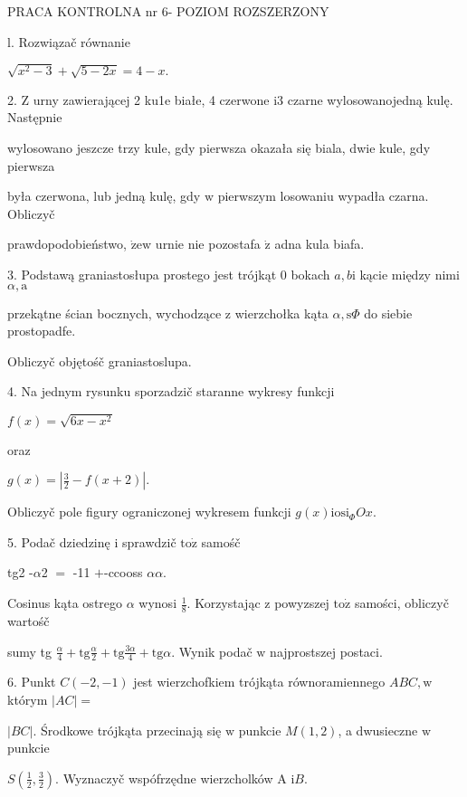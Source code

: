 \documentclass[a4paper,12pt]{article}
\begin{document}
PRACA KONTROLNA nr 6- POZIOM ROZSZERZONY

l. Rozwiązač równanie

$\sqrt{x^{2}-3}+\sqrt{5-2x}=4-x.$

2. $\mathrm{Z}$ urny zawierającej 2 ku1e białe, 4 czerwone $\mathrm{i}3$ czarne wylosowanojedną kulę. Następnie

wylosowano jeszcze trzy kule, gdy pierwsza okazała się biala, dwie kule, gdy pierwsza

była czerwona, lub jedną kulę, gdy $\mathrm{w}$ pierwszym losowaniu wypadła czarna. Obliczyč

prawdopodobieństwo, $\dot{\mathrm{z}}\mathrm{e}\mathrm{w}$ urnie nie pozostafa $\dot{\mathrm{z}}$ adna kula biafa.

3. Podstawą graniastosłupa prostego jest trójkąt $0$ bokach $a, b\mathrm{i}$ kącie między nimi $\alpha, \mathrm{a}$

przekątne ścian bocznych, wychodzące $\mathrm{z}$ wierzchołka kąta $\alpha, \mathrm{s}\Phi$ do siebie prostopadfe.

Obliczyč objętośč graniastoslupa.

4. Na jednym rysunku sporzadzič staranne wykresy funkcji

$f(x)=\sqrt{6x-x^{2}}$

oraz

$g(x)=|\displaystyle \frac{3}{2}-f(x+2)|.$

Obliczyč pole figury ograniczonej wykresem funkcji $g(x)\mathrm{i}\mathrm{o}\mathrm{s}\mathrm{i}_{\Phi}Ox.$

5. Podač dziedzinę $\mathrm{i}$ sprawdzič $\mathrm{t}\mathrm{o}\dot{\mathrm{z}}$ samośč

tg2 -$\alpha$2 $=$ -11 $+$-ccooss $\alpha\alpha$.

Cosinus kąta ostrego $\alpha$ wynosi $\displaystyle \frac{1}{8}$. Korzystając $\mathrm{z}$ powyzszej $\mathrm{t}\mathrm{o}\dot{\mathrm{z}}$ samości, obliczyč wartośč

sumy tg $\displaystyle \frac{\alpha}{4}+\mathrm{t}\mathrm{g}\frac{\alpha}{2}+\mathrm{t}\mathrm{g}\frac{3\alpha}{4}+\mathrm{t}\mathrm{g}\alpha$. Wynik podač $\mathrm{w}$ najprostszej postaci.

6. Punkt $C(-2,-1)$ jest wierzchofkiem trójkąta równoramiennego $ABC, \mathrm{w}$ którym $|AC|=$

$|BC|$. Środkowe trójkąta przecinają się $\mathrm{w}$ punkcie $M(1,2)$, a dwusieczne $\mathrm{w}$ punkcie

$S(\displaystyle \frac{1}{2},\frac{3}{2})$. Wyznaczyč wspófrzędne wierzcholków A $\mathrm{i}B.$
\end{document}
